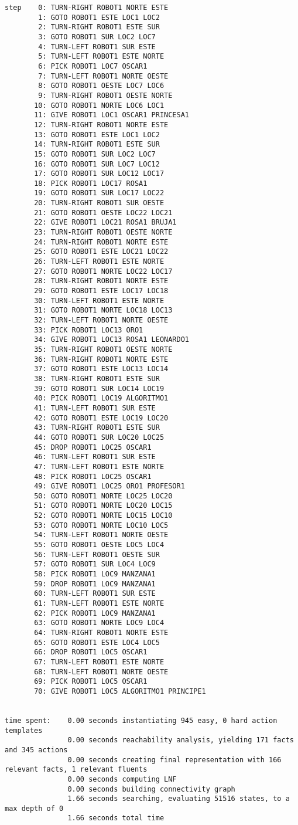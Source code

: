 \documentclass{article}
\begin{document}
\begin{lstlisting}
step    0: TURN-RIGHT ROBOT1 NORTE ESTE
        1: GOTO ROBOT1 ESTE LOC1 LOC2
        2: TURN-RIGHT ROBOT1 ESTE SUR
        3: GOTO ROBOT1 SUR LOC2 LOC7
        4: TURN-LEFT ROBOT1 SUR ESTE
        5: TURN-LEFT ROBOT1 ESTE NORTE
        6: PICK ROBOT1 LOC7 OSCAR1
        7: TURN-LEFT ROBOT1 NORTE OESTE
        8: GOTO ROBOT1 OESTE LOC7 LOC6
        9: TURN-RIGHT ROBOT1 OESTE NORTE
       10: GOTO ROBOT1 NORTE LOC6 LOC1
       11: GIVE ROBOT1 LOC1 OSCAR1 PRINCESA1
       12: TURN-RIGHT ROBOT1 NORTE ESTE
       13: GOTO ROBOT1 ESTE LOC1 LOC2
       14: TURN-RIGHT ROBOT1 ESTE SUR
       15: GOTO ROBOT1 SUR LOC2 LOC7
       16: GOTO ROBOT1 SUR LOC7 LOC12
       17: GOTO ROBOT1 SUR LOC12 LOC17
       18: PICK ROBOT1 LOC17 ROSA1
       19: GOTO ROBOT1 SUR LOC17 LOC22
       20: TURN-RIGHT ROBOT1 SUR OESTE
       21: GOTO ROBOT1 OESTE LOC22 LOC21
       22: GIVE ROBOT1 LOC21 ROSA1 BRUJA1
       23: TURN-RIGHT ROBOT1 OESTE NORTE
       24: TURN-RIGHT ROBOT1 NORTE ESTE
       25: GOTO ROBOT1 ESTE LOC21 LOC22
       26: TURN-LEFT ROBOT1 ESTE NORTE
       27: GOTO ROBOT1 NORTE LOC22 LOC17
       28: TURN-RIGHT ROBOT1 NORTE ESTE
       29: GOTO ROBOT1 ESTE LOC17 LOC18
       30: TURN-LEFT ROBOT1 ESTE NORTE
       31: GOTO ROBOT1 NORTE LOC18 LOC13
       32: TURN-LEFT ROBOT1 NORTE OESTE
       33: PICK ROBOT1 LOC13 ORO1
       34: GIVE ROBOT1 LOC13 ROSA1 LEONARDO1
       35: TURN-RIGHT ROBOT1 OESTE NORTE
       36: TURN-RIGHT ROBOT1 NORTE ESTE
       37: GOTO ROBOT1 ESTE LOC13 LOC14
       38: TURN-RIGHT ROBOT1 ESTE SUR
       39: GOTO ROBOT1 SUR LOC14 LOC19
       40: PICK ROBOT1 LOC19 ALGORITMO1
       41: TURN-LEFT ROBOT1 SUR ESTE
       42: GOTO ROBOT1 ESTE LOC19 LOC20
       43: TURN-RIGHT ROBOT1 ESTE SUR
       44: GOTO ROBOT1 SUR LOC20 LOC25
       45: DROP ROBOT1 LOC25 OSCAR1
       46: TURN-LEFT ROBOT1 SUR ESTE
       47: TURN-LEFT ROBOT1 ESTE NORTE
       48: PICK ROBOT1 LOC25 OSCAR1
       49: GIVE ROBOT1 LOC25 ORO1 PROFESOR1
       50: GOTO ROBOT1 NORTE LOC25 LOC20
       51: GOTO ROBOT1 NORTE LOC20 LOC15
       52: GOTO ROBOT1 NORTE LOC15 LOC10
       53: GOTO ROBOT1 NORTE LOC10 LOC5
       54: TURN-LEFT ROBOT1 NORTE OESTE
       55: GOTO ROBOT1 OESTE LOC5 LOC4
       56: TURN-LEFT ROBOT1 OESTE SUR
       57: GOTO ROBOT1 SUR LOC4 LOC9
       58: PICK ROBOT1 LOC9 MANZANA1
       59: DROP ROBOT1 LOC9 MANZANA1
       60: TURN-LEFT ROBOT1 SUR ESTE
       61: TURN-LEFT ROBOT1 ESTE NORTE
       62: PICK ROBOT1 LOC9 MANZANA1
       63: GOTO ROBOT1 NORTE LOC9 LOC4
       64: TURN-RIGHT ROBOT1 NORTE ESTE
       65: GOTO ROBOT1 ESTE LOC4 LOC5
       66: DROP ROBOT1 LOC5 OSCAR1
       67: TURN-LEFT ROBOT1 ESTE NORTE
       68: TURN-LEFT ROBOT1 NORTE OESTE
       69: PICK ROBOT1 LOC5 OSCAR1
       70: GIVE ROBOT1 LOC5 ALGORITMO1 PRINCIPE1


time spent:    0.00 seconds instantiating 945 easy, 0 hard action templates
               0.00 seconds reachability analysis, yielding 171 facts and 345 actions
               0.00 seconds creating final representation with 166 relevant facts, 1 relevant fluents
               0.00 seconds computing LNF
               0.00 seconds building connectivity graph
               1.66 seconds searching, evaluating 51516 states, to a max depth of 0
               1.66 seconds total time
\end{lstlisting}
\end{document}

